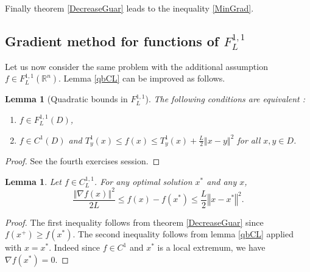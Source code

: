 \documentclass{article}
\newtheorem{lemma}[theorem]{Lemma}
\theoremstyle{definition}
\newcommand{\vnorm}[1]{\left\Vert #1 \right\Vert}
\begin{document}
Finally theorem \ref{DecreaseGuar} leads to the inequality \eqref{MinGrad}.

\subsection{Gradient method for functions of $F_L^{1,1}$}

Let us now consider the same problem with the additional assumption $f \in F_L^{1,1}(\mathbb{R}^n)$. Lemma \ref{qbCL} can be improved as follows.

\begin{lemma}[Quadratic bounds in $F_L^{1,1}$]
The following conditions are equivalent :
\begin{enumerate}[label=(\alph*)]
\item $f \in F_L^{1,1}(D)$,
\item $f \in C^1(D)$ and $T_y^1(x) \le f(x) \le  T_y^1(x) + \frac{L}{2}\vnorm{x-y}^2$ for all $x,y \in D$.
\end{enumerate}
\label{qbFL}
\end{lemma}
\begin{proof}
See the fourth exercises session.
\end{proof}

\begin{lemma}
Let $f \in C_L^{1,1}$. For any optimal solution $x^*$ and any $x$,
\begin{equation*}
\frac{{\vnorm{\nabla f(x)}}^2}{2L} \le f(x) - f(x^*) \le \frac{L}{2} {\vnorm{x-x^*}}^2 .
\end{equation*}
\end{lemma}
\begin{proof}
The first inequality follows from theorem \ref{DecreaseGuar} since $f(x^+) \ge f(x^*)$. The second inequality follows from lemma \ref{qbCL} applied with $x = x^*$. Indeed since $f \in C^1$ and $x^*$ is a local extremum, we have $\nabla f(x^*) = 0$.
\end{proof}
\end{document}
